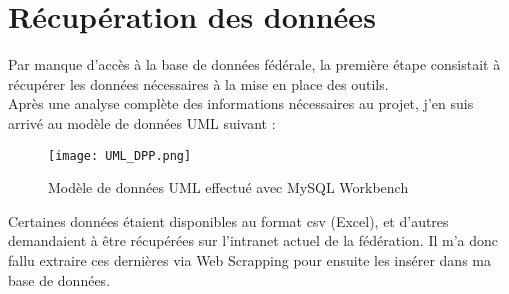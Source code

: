 \section{Récupération des données}
\vspace{1cm}

Par manque d’accès à la base de données fédérale, la première étape consistait à récupérer les données nécessaires à la mise en place des outils.\\
Après une analyse complète des informations nécessaires au projet, j’en suis arrivé au modèle de données UML suivant :

\begin{figure}[!h]
    \centering
    \texttt{[image: UML\_DPP.png]}
    \caption{Modèle de données UML effectué avec MySQL Workbench}
\end{figure}

\vspace{0.5cm}

Certaines données étaient disponibles au format csv (Excel), et d’autres demandaient à être récupérées sur l’intranet actuel de la fédération. Il m’a donc fallu extraire ces dernières via Web Scrapping pour ensuite les insérer dans ma base de données.